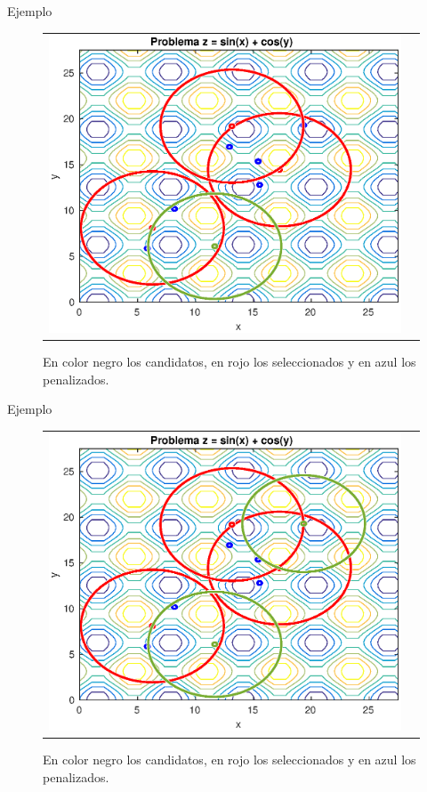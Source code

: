 \documentclass{beamer}
\begin{document}
\begin{frame}{Ejemplo}
\begin{figure}[H]
  \centering
  \begin{tabular}{c c}
   \includegraphics[scale=0.6]{Images/5.eps} 
  \end{tabular}
  \caption{\scriptsize En color negro los candidatos, en rojo los seleccionados y en azul los penalizados.}
\end{figure}
\end{frame}

\begin{frame}{Ejemplo}
\begin{figure}[H]
  \centering
  \begin{tabular}{c c}
   \includegraphics[scale=0.6]{Images/6.eps} 
  \end{tabular}
  \caption{\scriptsize En color negro los candidatos, en rojo los seleccionados y en azul los penalizados.}
\end{figure}
\end{frame}
\end{document}
